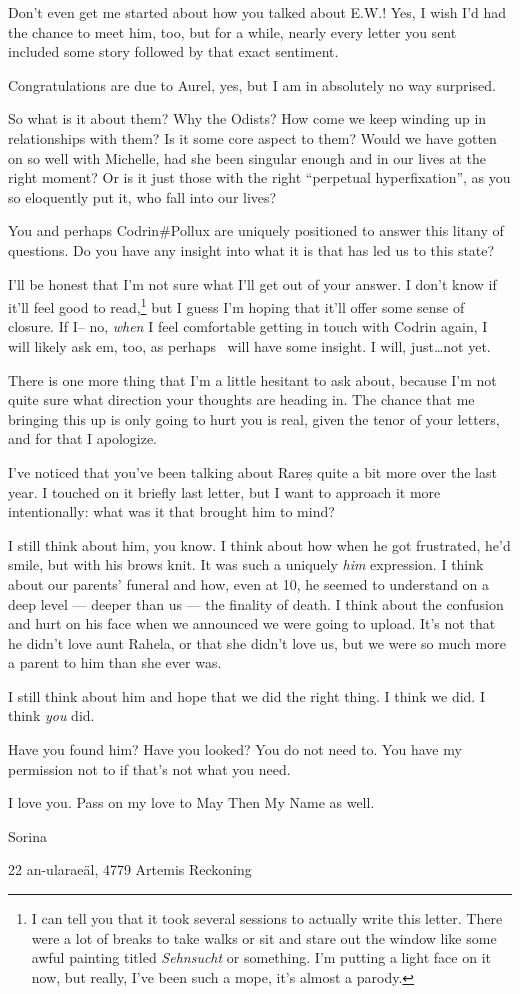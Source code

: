 Don't even get me started about how you talked about E.W.! Yes, I wish I'd had the chance to meet him, too, but for a while, nearly every letter you sent included some story followed by that exact sentiment.

Congratulations are due to Aurel, yes, but I am in absolutely no way surprised.

So what is it about them? Why the Odists? How come we keep winding up in relationships with them? Is it some core aspect to them? Would we have gotten on so well with Michelle, had she been singular enough and in our lives at the right moment? Or is it just those with the right ``perpetual hyperfixation'', as you so eloquently put it, who fall into our lives?

You and perhaps Codrin\#Pollux are uniquely positioned to answer this litany of questions. Do you have any insight into what it is that has led us to this state?

I'll be honest that I'm not sure what I'll get out of your answer. I don't know if it'll feel good to read,\footnote{I can tell you that it took several sessions to actually write this letter. There were a lot of breaks to take walks or sit and stare out the window like some awful painting titled \emph{Sehnsucht} or something. I'm putting a light face on it now, but really, I've been such a mope, it's almost a parody.} but I guess I'm hoping that it'll offer some sense of closure. If I-- no, \emph{when} I feel comfortable getting in touch with Codrin again, I will likely ask em, too, as perhaps \Partner\ will have some insight. I will, just\ldots not yet.

There is one more thing that I'm a little hesitant to ask about, because I'm not quite sure what direction your thoughts are heading in. The chance that me bringing this up is only going to hurt you is real, given the tenor of your letters, and for that I apologize.

I've noticed that you've been talking about Rareș quite a bit more over the last year. I touched on it briefly last letter, but I want to approach it more intentionally: what was it that brought him to mind?

I still think about him, you know. I think about how when he got frustrated, he'd smile, but with his brows knit. It was such a uniquely \emph{him} expression. I think about our parents' funeral and how, even at 10, he seemed to understand on a deep level — deeper than us — the finality of death. I think about the confusion and hurt on his face when we announced we were going to upload. It's not that he didn't love aunt Rahela, or that she didn't love us, but we were so much more a parent to him than she ever was.

I still think about him and hope that we did the right thing. I think we did. I think \emph{you} did.

Have you found him? Have you looked? You do not need to. You have my permission not to if that's not what you need.

I love you. Pass on my love to May Then My Name as well.

Sorina

22 an-ularaeäl, 4779 Artemis Reckoning
